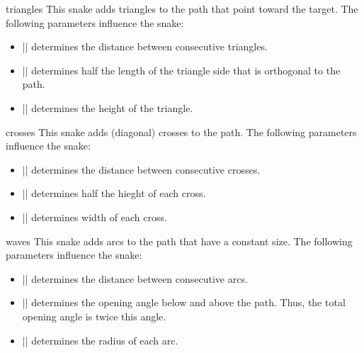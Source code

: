 \begin{snake}{triangles}
  This snake adds triangles to the path that point toward the
  target. The following parameters influence the snake: 
  \begin{itemize}
  \item |\pgfsnakesegmentlength|
    determines the distance between consecutive triangles.
  \item |\pgfsnakesegmentamplitude|
    determines half the length of the triangle side that is orthogonal
    to the path.
  \item |\pgfsnakesegmentobjectlength|
    determines the height of the triangle.
  \end{itemize}
\begin{codeexample}[]
\end{codeexample}
\end{snake}

\begin{snake}{crosses}
  This snake adds (diagonal) crosses to the path. The following
  parameters influence the snake:  
  \begin{itemize}
  \item |\pgfsnakesegmentlength|
    determines the distance between consecutive crosses.
  \item |\pgfsnakesegmentamplitude|
    determines half the hieght of each cross.
  \item |\pgfsnakesegmentobjectlength|
    determines width of each cross.
  \end{itemize}
\begin{codeexample}[]
\end{codeexample}
\end{snake}


\begin{snake}{waves}
  This snake adds arcs to the path that have a constant size. The
  following parameters influence the snake: 
  \begin{itemize}
  \item |\pgfsnakesegmentlength|
    determines the distance between consecutive arcs.
  \item |\pgfsnakesegmentangle|
    determines the opening angle below and above the path. Thus, the
    total opening angle is twice this angle.
  \item |\pgfsnakesegmentamplitude|
    determines the radius of each arc.
  \end{itemize}
\begin{codeexample}[]
\end{codeexample}
\end{snake}


